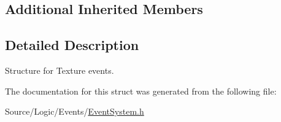 \subsection*{Additional Inherited Members}


\subsection{Detailed Description}
Structure for Texture events. 

The documentation for this struct was generated from the following file\+:\begin{DoxyCompactItemize}
\item 
Source/\+Logic/\+Events/\mbox{\hyperlink{_event_system_8h}{Event\+System.\+h}}\end{DoxyCompactItemize}
